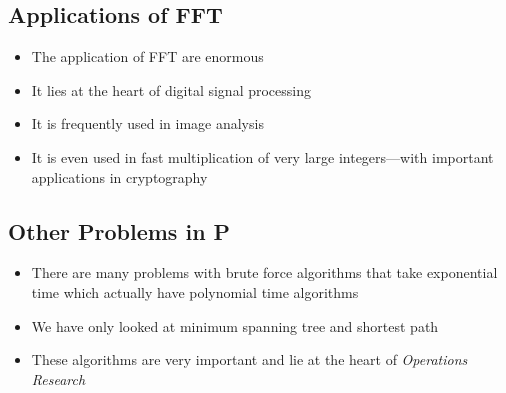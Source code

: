 
\begin{slide}
\section{Applications of FFT}

\begin{PauseHighLight}
  \begin{itemize}
  \item The application of FFT are enormous\pause
  \item It lies at the heart of digital signal processing\pause
  \item It is frequently used in image analysis\pause
  \item It is even used in fast multiplication of very large
    integers---with important applications in cryptography\pause
  \end{itemize}
\end{PauseHighLight}

\end{slide}


\Outline %

\begin{slide}
\section{Other Problems in P}

\begin{PauseHighLight}
  \begin{itemize}
  \item There are many problems with brute force algorithms that take
    exponential time which actually have polynomial time algorithms\pause
  \item We have only looked at minimum spanning tree and shortest
    path\pause
  \item These algorithms are very important and lie at the heart of
    \emph{Operations Research}\pause
  \end{itemize}
\end{PauseHighLight}

\end{slide}


